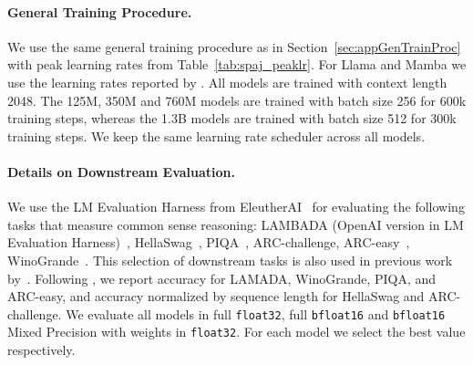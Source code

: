 \documentclass[dvipsnames]{article}
\begin{document}
\begin{appendix}
\paragraph{General Training Procedure.}
We use the same general training procedure as in Section~\ref{sec:appGenTrainProc} with peak learning rates from Table~\ref{tab:spaj_peaklr}.
For Llama and Mamba we use the learning rates reported by \citet{Gu:24arxiv}.
All models are trained with context length 2048.
The 125M, 350M and 760M models are trained with batch size 256 for 600k training steps, whereas the 1.3B models are trained with batch size 512 for 300k training steps.
We keep the same learning rate scheduler across all models.
\paragraph{Details on Downstream Evaluation.}
We use the LM Evaluation Harness from EleutherAI~\citep{Sutawika:23short} for evaluating the following tasks that measure common sense reasoning:
LAMBADA (OpenAI version in LM Evaluation Harness)~\citep{Paperno:16}, HellaSwag~\citep{Zellers:19}, PIQA~\citep{Bisk:20}, ARC-challenge, ARC-easy~\citep{Clark:18arxiv}, WinoGrande~\citep{Sakaguchi:21}.
This selection of downstream tasks is also used in
previous work by~\citet{Gu:24arxiv}.
Following \citet{Gu:24arxiv}, we report accuracy for LAMADA, WinoGrande, PIQA, and ARC-easy, and accuracy normalized by sequence length for HellaSwag and ARC-challenge.
We evaluate all models in full \texttt{float32}, full \texttt{bfloat16} and \texttt{bfloat16} Mixed Precision with weights in \texttt{float32}.
For each model we select the best value respectively.

\end{appendix}
\end{document}
